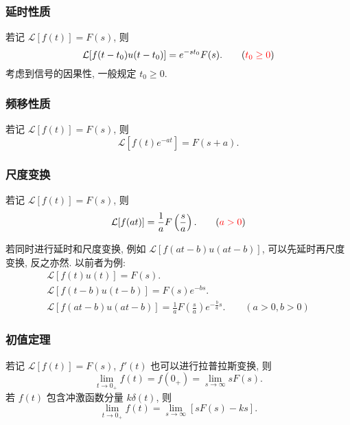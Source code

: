 \subsubsection{延时性质} \label{4.2 延时性质}
若记 $\mathcal{L}[f(t)]=F(s)$, 则
\begin{equation}
    \mathcal{L}[f(t-t_0)u(t-t_0)]=e^{-st_0}F(s).\qquad ({\color{red} t_0\geq 0})
\end{equation}
考虑到信号的因果性, 一般规定 $t_0\geq 0$.

\subsubsection{频移性质}
若记 $\mathcal{L}[f(t)]=F(s)$, 则
\begin{equation}
    \mathcal{L}[f(t)e^{-at}]=F(s+a).
\end{equation}

\subsubsection{尺度变换}
若记 $\mathcal{L}[f(t)]=F(s)$, 则
\begin{equation}
    \mathcal{L}[f(at)]=\frac{1}{a}F\left(\frac{s}{a}\right).\qquad ({\color{red} a>0})
\end{equation}

若同时进行延时和尺度变换, 例如 $\mathcal{L}[f(at-b)u(at-b)]$, 可以先延时再尺度变换, 反之亦然. 以前者为例:
\begin{gather}
    \nonumber \mathcal{L}[f(t)u(t)]=F(s). \\
    \nonumber \mathcal{L}[f(t-b)u(t-b)]=F(s)e^{-bs}. \\
    \mathcal{L}[f(at-b)u(at-b)]=\frac{1}{a}F\left(\frac{s}{a}\right)e^{-\frac{b}{a}s}.\qquad (a>0,b>0)
\end{gather}

\subsubsection{初值定理}
若记 $\mathcal{L}[f(t)]=F(s)$, $f'(t)$ 也可以进行拉普拉斯变换, 则
\begin{equation}
    \lim_{t\rightarrow 0_+}f(t)=f(0_+)=\lim_{s\rightarrow\infty}sF(s).
\end{equation}
若 $f(t)$ 包含冲激函数分量 $k\delta(t)$, 则
\begin{equation}
    \lim_{t\rightarrow 0_+}f(t)=\lim_{s\rightarrow\infty}[sF(s)-ks].
\end{equation}

